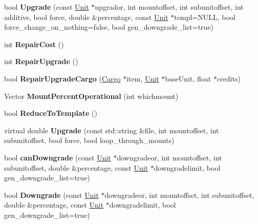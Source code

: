 \begin{DoxyCompactItemize}
\item 
bool {\bfseries Upgrade} (const \hyperlink{classUnit}{Unit} $\ast$upgrador, int mountoffset, int subunitoffset, int additive, bool force, double \&percentage, const \hyperlink{classUnit}{Unit} $\ast$templ=N\+U\+LL, bool force\+\_\+change\+\_\+on\+\_\+nothing=false, bool gen\+\_\+downgrade\+\_\+list=true)\hypertarget{classUnit_a5e6782f6c94a859c42b3519366f96c41}{}\label{classUnit_a5e6782f6c94a859c42b3519366f96c41}

\item 
int {\bfseries Repair\+Cost} ()\hypertarget{classUnit_a5d51f0e608bef616708f78f09b21990e}{}\label{classUnit_a5d51f0e608bef616708f78f09b21990e}

\item 
int {\bfseries Repair\+Upgrade} ()\hypertarget{classUnit_acbb6720c727c3a02a7c4404497ad4350}{}\label{classUnit_acbb6720c727c3a02a7c4404497ad4350}

\item 
bool {\bfseries Repair\+Upgrade\+Cargo} (\hyperlink{classCargo}{Cargo} $\ast$item, \hyperlink{classUnit}{Unit} $\ast$base\+Unit, float $\ast$credits)\hypertarget{classUnit_a6814a98be1d0c5f85d7438ead5ee2798}{}\label{classUnit_a6814a98be1d0c5f85d7438ead5ee2798}

\item 
Vector {\bfseries Mount\+Percent\+Operational} (int whichmount)\hypertarget{classUnit_abce8ebeb9dbcaaab141bde54a31ea81a}{}\label{classUnit_abce8ebeb9dbcaaab141bde54a31ea81a}

\item 
bool {\bfseries Reduce\+To\+Template} ()\hypertarget{classUnit_a52f00a84d1e0042f00431411e419cf7a}{}\label{classUnit_a52f00a84d1e0042f00431411e419cf7a}

\item 
virtual double {\bfseries Upgrade} (const std\+::string \&file, int mountoffset, int subunitoffset, bool force, bool loop\+\_\+through\+\_\+mounts)\hypertarget{classUnit_a8c4464e245e19747b41a8ed103ee215d}{}\label{classUnit_a8c4464e245e19747b41a8ed103ee215d}

\item 
bool {\bfseries can\+Downgrade} (const \hyperlink{classUnit}{Unit} $\ast$downgradeor, int mountoffset, int subunitoffset, double \&percentage, const \hyperlink{classUnit}{Unit} $\ast$downgradelimit, bool gen\+\_\+downgrade\+\_\+list=true)\hypertarget{classUnit_a1c4518bb2d559f6ecdb595c34247d659}{}\label{classUnit_a1c4518bb2d559f6ecdb595c34247d659}

\item 
bool {\bfseries Downgrade} (const \hyperlink{classUnit}{Unit} $\ast$downgradeor, int mountoffset, int subunitoffset, double \&percentage, const \hyperlink{classUnit}{Unit} $\ast$downgradelimit, bool gen\+\_\+downgrade\+\_\+list=true)\hypertarget{classUnit_afc5995c9763adf2a9909eb1eee580351}{}\label{classUnit_afc5995c9763adf2a9909eb1eee580351}


\end{DoxyCompactItemize}
